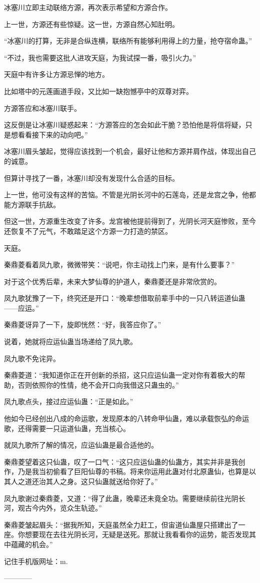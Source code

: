 \begin{this_body}
冰塞川立即主动联络方源，再次表示希望和方源合作。

上一世，方源还有些惊疑。这一世，方源自然心知肚明。

“冰塞川的打算，无非是合纵连横，联络所有能够利用得上的力量，抢夺宿命蛊。”

“不过，我也需要这批人进攻天庭，为我试探一番，吸引火力。”

天庭中有许多让方源忌惮的地方。

比如塔中的元莲画道手段，又比如一缺抱憾亭中的双尊对弈。

方源答应和冰塞川联手。

这反倒是让冰塞川疑惑起来：“方源答应的怎会如此干脆？恐怕他是将信将疑，只是想看看接下来的动向吧。”

冰塞川眉头皱起，觉得应该找到一个机会，最好让他和方源并肩作战，体现出自己的诚意。

但算计寻找了一番，冰塞川却没有发现什么合适的目标。

上一世，他可没有这样的苦恼。不管是光阴长河中的石莲岛，还是龙宫之争，他都能方源联手抗敌。

但这一世，方源重生改变了许多。龙宫被他提前得到了，光阴长河天庭惨败，至今还恢复不了元气，不敢踏足这个方源一力打造的禁区。

天庭。

秦鼎菱看着凤九歌，微微带笑：“说吧，你主动找上门来，是有什么要事？”

对于这个优秀后辈，未来大梦仙尊的护道人，秦鼎菱还是非常欣赏的。

凤九歌犹豫了一下，终究还是开口：“晚辈想借取前辈手中的一只八转运道仙蛊——应运。”

秦鼎菱讶异了一下，旋即恍然：“好，我答应你了。”

说着，她就将应运仙蛊当场递给了凤九歌。

凤九歌不免诧异。

秦鼎菱道：“我知道你正在开创新的杀招，这只应运仙蛊一定对你有着极大的帮助，否则依照你的性情，绝不会开口向我借这只蛊虫的。”

凤九歌点头，接过应运仙蛊：“正是如此。”

他如今已经创出八成的命运歌，发现原本的八转命甲仙蛊，难以承载恢弘的命运歌，还得需要一只运道仙蛊，充当核心。

就凤九歌所了解的情况，应运仙蛊是最合适他的。

秦鼎菱望着这只仙蛊，叹了一口气：“这只应运仙蛊的仙蛊方，其实并非是我创作，乃是我当初偷看了巨阳仙尊的书稿。将来你运用此蛊对付北原蛊仙，也算是以其人之道还治其人之身。这只仙蛊就送给你好了。”

凤九歌谢过秦鼎菱，又道：“得了此蛊，晚辈还未竟全功。需要继续前往光阴长河，观古今内外，览众生轨迹。”

秦鼎菱皱起眉头：“据我所知，天庭虽然全力赶工，但宙道仙蛊屋只搭建出了一座。你想要现在去往光阴长河，无疑是送死。那就让我看看你的运势，能否发现其中蕴藏的机会。”

记住手机版网址：m.

------------

\end{this_body}

